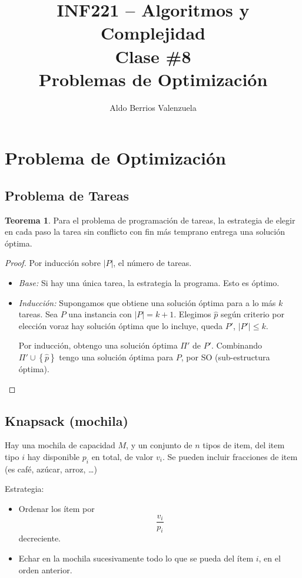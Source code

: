 \documentclass[english, spanish, fleqn, 10pt]{article}
\author{Aldo Berrios Valenzuela}
\title{INF221 -- Algoritmos y Complejidad\\[.4\baselineskip]Clase \#8\\Problemas de Optimización}
\numberwithin{equation}{section}
\newcommand{\llaves}[1]{\left \{ #1 \right \}}
\newcommand{\nabsoluto}[1]{\left| #1 \right|}
\theoremstyle{definition}
\newtheorem{teorema}{Teorema}[section]
\begin{document}
\maketitle
\section{Problema de Optimización}
\subsection{Problema de Tareas}
\begin{teorema}
	Para el problema de programación de tareas, la estrategia de elegir en cada paso la tarea sin conflicto con fin más temprano entrega una solución óptima.
\end{teorema}

\begin{proof}
	Por inducción sobre $\nabsoluto{P}$, el número de tareas.
	\begin{itemize}
		\item \emph{Base:} Si hay una única tarea, la estrategia la programa. Esto es óptimo.
		
		\item \emph{Inducción:} Supongamos que obtiene una solución óptima para a lo más $k$ tareas. Sea $P$ una instancia con $\nabsoluto{P}=k+1$. Elegimos $\hat{p}$ según criterio por elección voraz hay solución óptima que lo incluye, queda $P'$, $\nabsoluto{P'}\leq k$.
		
		Por inducción, obtengo una solución óptima $\Pi'$ de $P'$. Combinando $\Pi'\cup\llaves{\hat p}$ tengo una solución óptima para $P$, por SO (sub-estructura óptima).
	\end{itemize}
\end{proof}

\subsection{Knapsack (mochila)}
Hay una mochila de capacidad $M$, y un conjunto de $n$ tipos de item, del item tipo $i$ hay disponible $p_i$ en total, de valor $v_i$. Se pueden incluir fracciones de item (es café, azúcar, arroz, \ldots)

Estrategia:
\begin{itemize}
	\item Ordenar los ítem por
	\begin{equation*}
	\dfrac{v_i}{p_i}
	\end{equation*}
	decreciente.
	
	\item Echar en la mochila sucesivamente todo lo que se pueda del ítem $i$, en el orden anterior.
\end{itemize}
\end{document}
